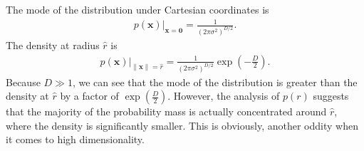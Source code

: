 \begin{answer}{}
	The mode of the distribution under Cartesian coordinates is
	\begin{align}
		\left. p(\bm{x})\right\rvert_{\bm{x} = \bm{0}} = \frac{1}{(2\pi\sigma^2)^{D/2}}.
	\end{align}
	The density at radius $\hat{r}$ is
	\begin{align}
		\left. p(\bm{x})\right\rvert_{\lVert\bm{x}\rVert = \hat{r}} = \frac{1}{(2\pi\sigma^2)^{D/2}}\exp\left(-\frac{D}{2}\right).
	\end{align}
	Because $D \gg 1$, we can see that the mode of the distribution is greater than the density at $\hat{r}$ by a factor of $\exp\left(\frac{D}{2}\right)$. However, the analysis of $p(r)$ suggests that the majority of the probability mass is actually concentrated around $\hat{r}$, where the density is significantly smaller. This is obviously, another oddity when it comes to high dimensionality.
\end{answer}